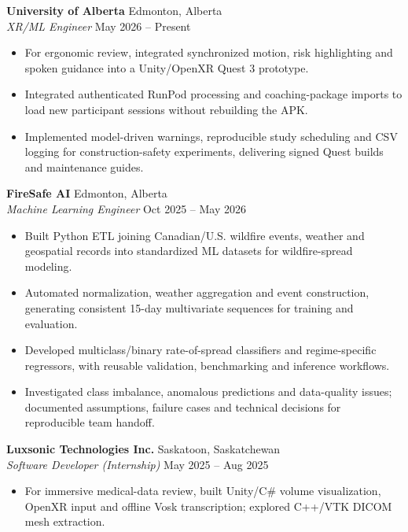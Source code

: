 \documentclass[10pt]{article}
\begin{document}
\textbf{University of Alberta}
\hfill Edmonton, Alberta\\
\textit{XR/ML Engineer}
\hfill May 2026 -- Present

\begin{itemize}
    \item For ergonomic review, integrated synchronized motion, risk highlighting and spoken guidance into a Unity/OpenXR Quest 3 prototype.
    \item Integrated authenticated RunPod processing and coaching-package imports to load new participant sessions without rebuilding the APK.
    \item Implemented model-driven warnings, reproducible study scheduling and CSV logging for construction-safety experiments, delivering signed Quest builds and maintenance guides.
\end{itemize}

\textbf{FireSafe AI}
\hfill Edmonton, Alberta\\
\textit{Machine Learning Engineer}
\hfill Oct 2025 -- May 2026

\begin{itemize}
    \item Built Python ETL joining Canadian/U.S. wildfire events, weather and geospatial records into standardized ML datasets for wildfire-spread modeling.
    \item Automated normalization, weather aggregation and event construction, generating consistent 15-day multivariate sequences for training and evaluation.
    \item Developed multiclass/binary rate-of-spread classifiers and regime-specific regressors, with reusable validation, benchmarking and inference workflows.
    \item Investigated class imbalance, anomalous predictions and data-quality issues; documented assumptions, failure cases and technical decisions for reproducible team handoff.
\end{itemize}

\textbf{Luxsonic Technologies Inc.}
\hfill Saskatoon, Saskatchewan\\
\textit{Software Developer (Internship)}
\hfill May 2025 -- Aug 2025

\begin{itemize}
    \item For immersive medical-data review, built Unity/C\# volume visualization, OpenXR input and offline Vosk transcription; explored C++/VTK DICOM mesh extraction.
\end{itemize}
\end{document}
